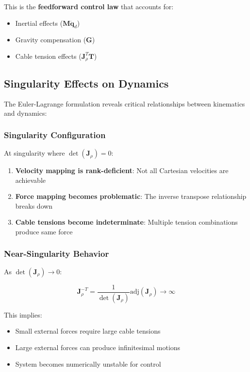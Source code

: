 This is the \textbf{feedforward control law} that accounts for:
\begin{itemize}
    \item Inertial effects ($\mathbf{M} \ddot{\mathbf{q}}_d$)
    \item Gravity compensation ($\mathbf{G}$)
    \item Cable tension effects ($\mathbf{J}_{\rho}^T \mathbf{T}$)
\end{itemize}

\subsection{Singularity Effects on Dynamics}

The Euler-Lagrange formulation reveals critical relationships between kinematics and dynamics:

\subsubsection{Singularity Configuration}

At singularity where $\det(\mathbf{J}_{\rho}) = 0$:

\begin{enumerate}
    \item \textbf{Velocity mapping is rank-deficient}: Not all Cartesian velocities are achievable
    \item \textbf{Force mapping becomes problematic}: The inverse transpose relationship breaks down
    \item \textbf{Cable tensions become indeterminate}: Multiple tension combinations produce same force
\end{enumerate}

\subsubsection{Near-Singularity Behavior}

As $\det(\mathbf{J}_{\rho}) \to 0$:

\begin{equation}
\mathbf{J}_{\rho}^{-T} = \frac{1}{\det(\mathbf{J}_{\rho})} \text{adj}(\mathbf{J}_{\rho}) \to \infty
\end{equation}

This implies:
\begin{itemize}
    \item Small external forces require large cable tensions
    \item Large external forces can produce infinitesimal motions
    \item System becomes numerically unstable for control
\end{itemize}

